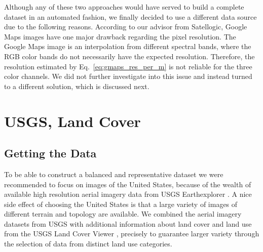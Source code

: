 Although any of these two approaches would have served to build a complete dataset in an automated fashion, we finally decided to use a different data source due to the following reasons. According to our advisor from Satellogic, Google Maps images have one major drawback regarding the pixel resolution. The Google Maps image is an interpolation from different spectral bands, where the RGB color bands do not necessarily have the expected resolution. Therefore, the resolution estimated by Eq.~\ref{eq:gmaps_res_per_m} is not reliable for the three color channels. We did not further investigate into this issue and instead turned to a different solution, which is discussed next.



\section{USGS, Land Cover}

\subsection{Getting the Data}
To be able to construct a balanced and representative dataset we were recommended to focus on images of the United States, 
because of the wealth of available high resolution aerial imagery data from USGS Earthexplorer \parencite{usgs}. A nice side effect of choosing the United States is that a large variety of images of different terrain and topology are available. We combined the aerial imagery datasets from USGS with additional information about land cover and land use from the USGS Land Cover Viewer \parencite{land_cover_viewer}, precisely to guarantee larger variety through the selection of data from distinct land use categories.

